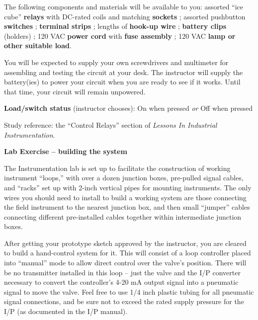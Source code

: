 \vskip 10pt

The following components and materials will be available to you: assorted ``ice cube'' {\bf relays} with DC-rated coils and matching {\bf sockets} ; assorted pushbutton {\bf switches} ; {\bf terminal strips} ; lengths of {\bf hook-up wire} ; {\bf battery clips} (holders) ; 120 VAC {\bf power cord} with {\bf fuse assembly} ; 120 VAC {\bf lamp or other suitable load}.

\vskip 10pt

You will be expected to supply your own screwdrivers and multimeter for assembling and testing the circuit at your desk.  The instructor will supply the battery(ies) to power your circuit when you are ready to see if it works.  Until that time, your circuit will remain unpowered.

\vskip 20pt

\noindent
{\bf Load/switch status} (instructor chooses): \hskip 20pt \underbar{\hskip 20pt} On when pressed \hskip 10pt {\it or} \hskip 10pt \underbar{\hskip 20pt} Off when pressed

\vfil

Study reference: the ``Control Relays'' section of {\it Lessons In Industrial Instrumentation}.







\vfil \eject

\noindent
{\bf Lab Exercise -- building the system}

\vskip 5pt

The Instrumentation lab is set up to facilitate the construction of working instrument ``loops,'' with over a dozen junction boxes, pre-pulled signal cables, and ``racks'' set up with 2-inch vertical pipes for mounting instruments.  The only wires you should need to install to build a working system are those connecting the field instrument to the nearest junction box, and then small ``jumper'' cables connecting different pre-installed cables together within intermediate junction boxes.

After getting your prototype sketch approved by the instructor, you are cleared to build a hand-control system for it.  This will consist of a loop controller placed into ``manual'' mode to allow direct control over the valve's position.  There will be no transmitter installed in this loop -- just the valve and the I/P converter necessary to convert the controller's 4-20 mA output signal into a pneumatic signal to move the valve.  Feel free to use 1/4 inch plastic tubing for all pneumatic signal connections, and be sure not to exceed the rated supply pressure for the I/P (as documented in the I/P manual).

